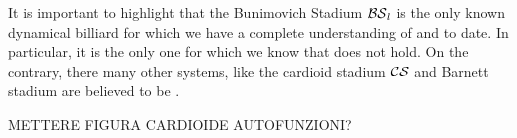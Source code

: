 \begin{compactitem}
\end{compactitem}


\begin{remark}
\label{remark:unique_non_que_bun_std}
It is important to highlight that the Bunimovich Stadium $\operatorname{\mathcal{BS}}_{l}$ is the only known dynamical billiard for which we have a complete understanding of \QE and \QUE to date. In particular, it is the only one for which we know that \QUE does not hold. On the contrary, there many other systems, like the cardioid stadium $\operatorname{\mathcal{CS}}$ and Barnett stadium are believed to be \QUE.
\end{remark}


METTERE FIGURA CARDIOIDE AUTOFUNZIONI?


%
%
%
%





